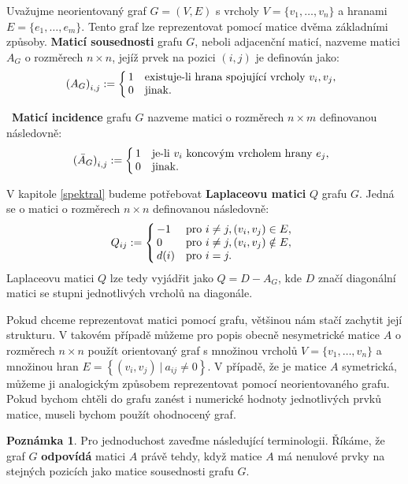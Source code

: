 \documentclass[11pt,american,czech,oneside]{book}
\theoremstyle{plain}
\theoremstyle{definition}
\newtheorem{remark}{Poznámka}
\begin{document}
Uvažujme neorientovaný graf $G=(V,E)$ s vrcholy $V = \{v_1, \ldots, v_n\}$ a hranami $E = \{e_1, \ldots, e_m\}$. Tento graf lze reprezentovat pomocí matice dvěma základními způsoby. \textbf{Maticí sousednosti} grafu $G$, neboli adjacenční maticí, nazveme matici $A_G$ o rozměrech $n \times n$, jejíž prvek na pozici $(i,j)$ je definován jako:
\[
  {(A_G)}_{i,j} :=
  \left\{
    \begin{array}{@{\,}ll}
      1  & \mbox{existuje-li hrana spojující vrcholy $v_i, v_j$,} \\
      0  & \mbox{jinak.}
    \end{array}
  \right.
\]

 \textbf{Maticí incidence} grafu $G$ nazveme matici o rozměrech $n \times m$  definovanou následovně:
\[
  {(\bar{A}_G)}_{i,j} :=
  \left\{
	  \begin{array}{@{\,}ll}
		  1  & \mbox{je-li $v_i$ koncovým vrcholem hrany $e_j$,} \\
		  0  & \mbox{jinak.}
	  \end{array}
  \right.
\]

V kapitole \ref{spektral} budeme potřebovat \textbf{Laplaceovu matici} $Q$ grafu $G$. Jedná se o matici o rozměrech $n \times n$ definovanou následovně:
\[
Q_{ij} :=
\left\{
	\begin{array}{@{\,}ll}
		-1  & \mbox{pro } i \neq j, (v_i,v_j) \in E, \\
		0 & \mbox{pro } i \neq j, (v_i,v_j) \notin E,\\
        d(i) & \mbox{pro } i = j.
	\end{array}
\right.
\]
Laplaceovu matici $Q$ lze tedy vyjádřit jako $Q = D - A_G$, kde $D$  značí diagonální matici se stupni jednotlivých vrcholů na diagonále.

\medskip

Pokud chceme reprezentovat matici pomocí grafu, většinou nám stačí zachytit její strukturu. V takovém případě můžeme pro popis obecně nesymetrické matice $A$ o rozměrech $n \times n$ použít orientovaný graf s množinou vrcholů $V = \{v_1,\ldots,v_n\}$ a množinou hran $E =\left\{(v_i,v_j) \ | \ a_{ij}\neq 0\right\}$. V případě, že je matice $A$ symetrická, můžeme ji analogickým způsobem reprezentovat pomocí neorientovaného grafu.
Pokud bychom chtěli do grafu zanést i numerické hodnoty jednotlivých prvků matice, museli bychom použít ohodnocený graf.

\begin{remark}
  Pro jednoduchost zaveďme následující terminologii. Říkáme, že graf $G$ \textbf{odpovídá} matici $A$ právě tehdy, když matice $A$ má nenulové prvky na stejných pozicích jako matice sousednosti grafu $G$.
\end{remark}
\end{document}
